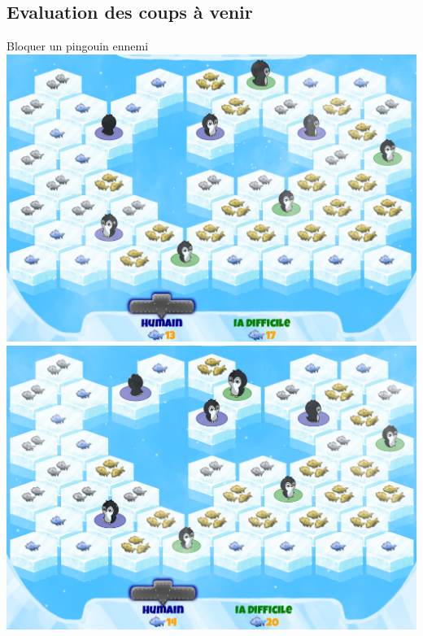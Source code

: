 \documentclass{beamer}
\begin{document}
\subsection{Evaluation des coups à venir}
\begin{frame}{}
\begin{block}{}
\begin{center}
 Bloquer un pingouin ennemi
 \includegraphics[scale=0.1]{IA5}
 \includegraphics[scale=0.1]{IA6}
\end{center}
\end{block}
\end{frame}
\end{document}
